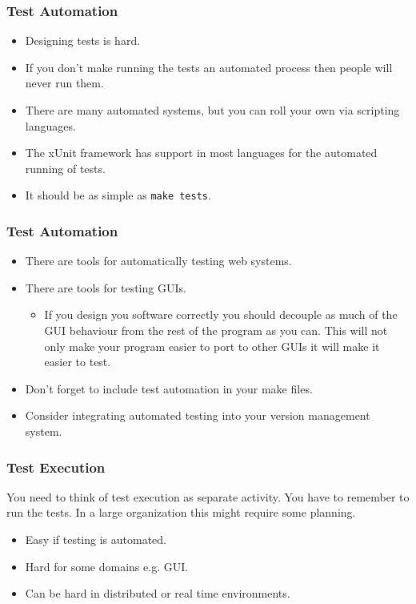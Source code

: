 \documentclass{beamer}
\begin{document}
\begin{frame}
  \frametitle{Test Automation}
  \begin{itemize}
  \item Designing tests is hard.
  \item If you don't make running the tests an automated process then
    people will never run them.
  \item There are many automated systems, but you can roll your own
    via scripting languages.   
  \item The xUnit framework has support in most languages for the
    automated running of tests. 
  \item It should be as simple as {\tt make tests}.
  \end{itemize}
\end{frame}
\begin{frame}
  \frametitle{Test Automation}
  \begin{itemize}
  \item There are tools for automatically testing web systems.
  \item There are tools for testing GUIs.
    \begin{itemize}
    \item If you design you software correctly you should decouple as
      much of the GUI behaviour from the rest of the program as you
      can. This will not only make your program easier to port to
      other GUIs it will make it easier to test.
    \end{itemize}
  \item Don't forget to include test  automation  in your make files.
  \item Consider integrating automated testing into your version
    management system.  
  \end{itemize}
\end{frame}
\begin{frame}
  \frametitle{Test Execution}
You need to think of test execution as separate activity. You have to
remember to run the tests. In a large organization this might require
some planning.    
  \begin{itemize}
  \item Easy if testing is automated.
  \item Hard for some domains e.g. GUI.
  \item Can be hard in distributed or real time environments.
  \end{itemize}
\end{frame}
\end{document}
